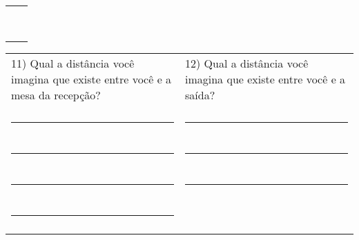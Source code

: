 \begin{table}[!htb]
\begin{tabular}{m{0.5\linewidth} m{0.5\linewidth}}
        & \\
        \rule{\linewidth}{.2mm} & \\
        & \\
\end{tabular}
    \begin{tabular}{m{0.5\linewidth} m{0.5\linewidth}}
        11)	Qual a distância você imagina que existe entre você e a mesa da recepção? & 12)	Qual a distância você imagina que existe entre você e a saída? \\
        & \\
        \rule{\linewidth}{.2mm} & \rule{\linewidth}{.2mm}\\
        & \\
        \rule{\linewidth}{.2mm} & \rule{\linewidth}{.2mm}\\
        & \\
        \rule{\linewidth}{.2mm} & \rule{\linewidth}{.2mm}\\
        & \\
        \rule{\linewidth}{.2mm} & \\
        & \\
    \end{tabular}
\end{table}

\FloatBarrier
\pagebreak
